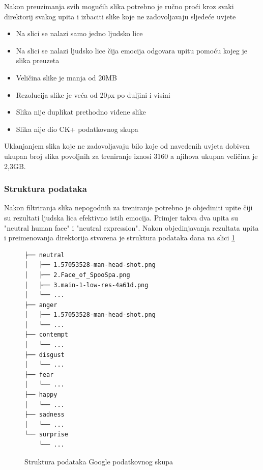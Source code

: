 \documentclass[times, utf8, zavrsni,numeric]{fer}
\begin{document}
\noindent
Nakon preuzimanja svih mogućih slika potrebno je ručno proći kroz svaki direktorij svakog upita i izbaciti slike koje ne zadovoljavaju sljedeće uvjete \label{google_npy_filter}

\begin{itemize}
	\item Na slici se nalazi samo jedno ljudsko lice
	\item Na slici se nalazi ljudsko lice čija emocija odgovara upitu pomoću kojeg je slika preuzeta
	\item Veličina slike je manja od 20MB
	\item Rezolucija slike je veća od 20px po duljini i visini
	\item Slika nije duplikat prethodno viđene slike
	\item Slika nije dio CK+ podatkovnog skupa
\end{itemize}
Uklanjanjem slika koje ne zadovoljavaju bilo koje od navedenih uvjeta dobiven ukupan broj slika povoljnih za treniranje iznosi 3160 a njihova ukupna veličina je 2,3GB.

\subsubsection{Struktura podataka}
Nakon filtriranja slika nepogodnih za treniranje potrebno je objediniti upite čiji su rezultati ljudska lica efektivno istih emocija. Primjer takva dva upita su "neutral human face" i "neutral expression". Nakon objedinjavanja rezultata upita i preimenovanja direktorija stvorena je struktura podataka dana na slici \ref{cb:google_file_structure}


\begin{figure}[H]
\centering
\begin{Verbatim}[fontsize=\small]
├── neutral
│   ├── 1.57053528-man-head-shot.png
│   ├── 2.Face_of_SpooSpa.png
│   ├── 3.main-1-low-res-4a61d.png
│   └── ...
├── anger
│   ├── 1.57053528-man-head-shot.png
│   └── ...
├── contempt
│   └── ...
├── disgust
│   └── ...
├── fear
│   └── ...
├── happy
│   └── ...
├── sadness
│   └── ...
└── surprise
    └── ...
\end{Verbatim}
\caption{Struktura podataka Google podatkovnog skupa}
\label{cb:google_file_structure}
\end{figure}
\end{document}
